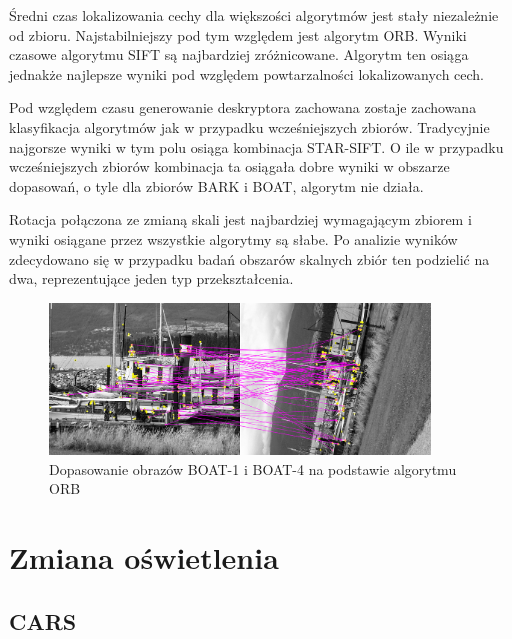 Średni czas lokalizowania cechy dla większości algorytmów jest stały niezależnie od zbioru. Najstabilniejszy pod tym względem jest algorytm ORB. Wyniki czasowe algorytmu SIFT są najbardziej zróżnicowane. Algorytm ten osiąga jednakże najlepsze wyniki pod względem powtarzalności lokalizowanych cech.

Pod względem czasu generowanie deskryptora zachowana zostaje zachowana klasyfikacja algorytmów jak w przypadku wcześniejszych zbiorów. Tradycyjnie najgorsze wyniki w tym polu osiąga kombinacja STAR-SIFT. O ile w przypadku wcześniejszych zbiorów kombinacja ta osiągała dobre wyniki w obszarze dopasowań, o tyle dla zbiorów BARK i BOAT, algorytm nie działa.

Rotacja połączona ze zmianą skali jest najbardziej wymagającym zbiorem i wyniki osiągane przez wszystkie algorytmy są słabe. Po analizie wyników zdecydowano się w przypadku badań obszarów skalnych zbiór ten podzielić na dwa, reprezentujące jeden typ przekształcenia.

\begin{figure}
\centering
\includegraphics[width=0.9\textwidth]{pict/badania/boat_orb_1_4.png}
\caption{Dopasowanie obrazów BOAT-1 i BOAT-4 na podstawie algorytmu ORB}
\end{figure}



\FloatBarrier
\section{Zmiana oświetlenia}
\subsection{CARS}

